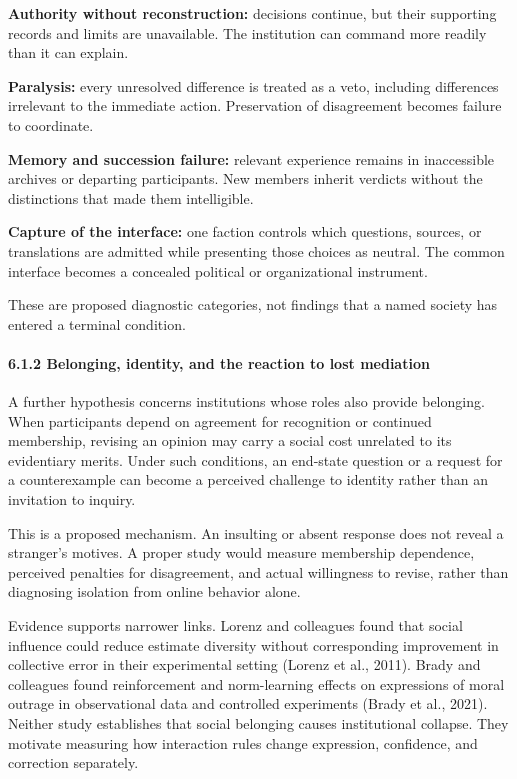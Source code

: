 \documentclass[
  10pt,
]{article}
\begin{document}
\textbf{Authority without reconstruction:} decisions continue, but their supporting records and limits are unavailable. The institution can command more readily than it can explain.

\textbf{Paralysis:} every unresolved difference is treated as a veto, including differences irrelevant to the immediate action. Preservation of disagreement becomes failure to coordinate.

\textbf{Memory and succession failure:} relevant experience remains in inaccessible archives or departing participants. New members inherit verdicts without the distinctions that made them intelligible.

\textbf{Capture of the interface:} one faction controls which questions, sources, or translations are admitted while presenting those choices as neutral. The common interface becomes a concealed political or organizational instrument.

These are proposed diagnostic categories, not findings that a named society has entered a terminal condition.

\paragraph{6.1.2 Belonging, identity, and the reaction to lost mediation}\label{belonging-identity-and-the-reaction-to-lost-mediation}

A further hypothesis concerns institutions whose roles also provide belonging. When participants depend on agreement for recognition or continued membership, revising an opinion may carry a social cost unrelated to its evidentiary merits. Under such conditions, an end-state question or a request for a counterexample can become a perceived challenge to identity rather than an invitation to inquiry.

This is a proposed mechanism. An insulting or absent response does not reveal a stranger's motives. A proper study would measure membership dependence, perceived penalties for disagreement, and actual willingness to revise, rather than diagnosing isolation from online behavior alone.

Evidence supports narrower links. Lorenz and colleagues found that social influence could reduce estimate diversity without corresponding improvement in collective error in their experimental setting (Lorenz et al., 2011). Brady and colleagues found reinforcement and norm-learning effects on expressions of moral outrage in observational data and controlled experiments (Brady et al., 2021). Neither study establishes that social belonging causes institutional collapse. They motivate measuring how interaction rules change expression, confidence, and correction separately.
\end{document}

